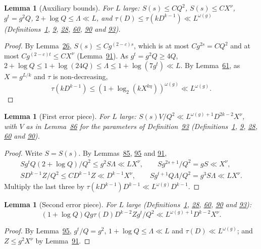 \documentclass[11pt]{article}
\newcounter{hffc}
\theoremstyle{definition}\newtheorem{hffdef}[hffc]{Definition}
\theoremstyle{plain}\newtheorem{hfflem}[hffc]{Lemma}\newtheorem{hffthm}[hffc]{Theorem}
\theoremstyle{remark}\newtheorem{hffrem}[hffc]{Remark}
\newcommand{\hffcost}{}
\newcommand{\setcost}[1]{\renewcommand{\hffcost}{#1}}
\begin{document}
\begin{hfflem}[Auxiliary bounds]\label{L:aux}
For $L$ large: $S(s)\le CQ^2$, $S(s)\le CX^\nu$, $g^t=g^2Q$, $2+\log Q\le\Lambda\ll L$, and $\tau(D)\le\tau(kD^{k-1})\ll L^{\omega(g)}$ (Definitions~\hyperref[D:conv]{1}, \hyperref[D:psi]{9}, \hyperref[D:pal]{28}, \hyperref[D:gpart]{60}, \hyperref[D:par]{90} and \hyperref[D:setB]{93}).
\par\nopagebreak{}
\end{hfflem}
\begin{proof}\setcost{length 194/300}By Lemma~\hyperref[L:saving]{26}, $S(s)\le Cg^{(2-c)s}$, which is at most $Cg^{2s}=CQ^2$ and at most $Cg^{(2-c)t}\le CX^\nu$ (Lemma~\hyperref[L:adm]{91}). As $g^t=g^2Q\ge4Q$, $2+\log Q\le1+\log(24Q)\le\Lambda\le1+\log(7g^t)\ll L$. By Lemma~\hyperref[L:tau]{61}, as $X=g^{L/k}$ and $\tau$ is non-decreasing, \[\tau(kD^{k-1})\le(1+\log_2(kX^{k\eta}))^{\omega(g)}\ll L^{\omega(g)}.\]
\end{proof}

\begin{hfflem}[First error piece]\label{L:err1}
For $L$ large: $S(s)V/Q^2\ll L^{\omega(g)+1}D^{2k-2}X^\nu$, with $V$ as in Lemma~\hyperref[L:E]{86} for the parameters of Definition~\hyperref[D:setB]{93} (Definitions~\hyperref[D:conv]{1}, \hyperref[D:psi]{9}, \hyperref[D:pal]{28}, \hyperref[D:gpart]{60} and \hyperref[D:par]{90}).
\par\nopagebreak{}
\end{hfflem}
\begin{proof}\setcost{length 161/300}Write $S=S(s)$. By Lemmas~\hyperref[L:W]{85}, \hyperref[L:aux]{95} and \hyperref[L:adm]{91}, \[\begin{gathered}Sg^tQ(2+\log Q)/Q^2\le g^2S\Lambda\ll LX^\nu,\qquad Sg^{2s+1}/Q^2=gS\ll X^\nu,\\ SD^{k-1}Z/Q^2\le CD^{k-1}Z\ll D^{k-1}X^\nu,\qquad Sg^{t+1}Q\Lambda/Q^2=g^3S\Lambda\ll LX^\nu.\end{gathered}\] Multiply the last three by $\tau(kD^{k-1})D^{k-1}\ll L^{\omega(g)}D^{k-1}$.
\end{proof}

\begin{hfflem}[Second error piece]\label{L:err2}
For $L$ large (Definitions~\hyperref[D:conv]{1}, \hyperref[D:pal]{28}, \hyperref[D:gpart]{60}, \hyperref[D:par]{90} and \hyperref[D:setB]{93}): \[(1+\log Q)Qg\tau(D)D^{k-2}Zg^t/Q^2\ll L^{\omega(g)+1}D^{k-2}X^\nu.\]
\par\nopagebreak{}
\end{hfflem}
\begin{proof}\setcost{length 61/300}By Lemma~\hyperref[L:aux]{95}, $g^t/Q=g^2$, $1+\log Q\le\Lambda\ll L$ and $\tau(D)\ll L^{\omega(g)}$; and $Z\le g^2X^\nu$ by Lemma~\hyperref[L:adm]{91}.
\end{proof}
\end{document}
